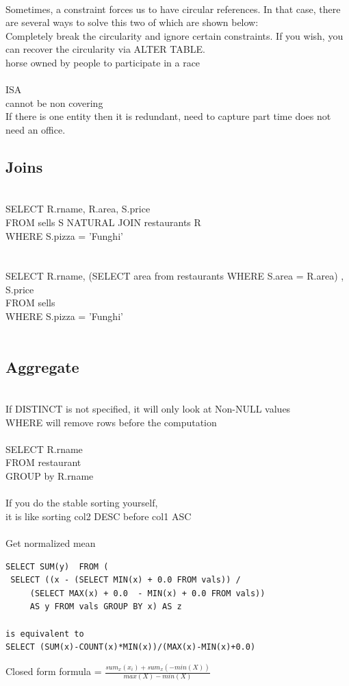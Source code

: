 \documentclass[11pt]{article}
\begin{document}
\\
Sometimes, a constraint forces us to have circular references.  In that case, there are several ways to solve this two of which are shown below:
\\
Completely break the circularity and ignore certain constraints.
If you wish, you can recover the circularity via ALTER TABLE.
\\
horse owned by people to participate in a race
\\\\
ISA\\ 
cannot be non covering\\
If there is one entity then it is redundant, need to capture part time does not need an office.
\\
\subsection*{Joins}\\
SELECT R.rname, R.area, S.price\\
FROM sells S NATURAL JOIN restaurants R\\
WHERE S.pizza = 'Funghi'\\
\\\\
SELECT R.rname, (SELECT area from restaurants WHERE S.area = R.area) , S.price\\
FROM sells \\
WHERE S.pizza = 'Funghi'\\\\
\subsection*{Aggregate}\\
If DISTINCT is not specified, it will only look at Non-NULL values\\
WHERE will remove rows before the computation\\
\\
SELECT R.rname\\
FROM restaurant \\
GROUP by R.rname\\
\\
If you do the stable sorting yourself,\\
it is like sorting col2 DESC before col1 ASC
\\
\\
Get normalized mean
\begin{verbatim}
SELECT SUM(y)  FROM (
 SELECT ((x - (SELECT MIN(x) + 0.0 FROM vals)) /
	 (SELECT MAX(x) + 0.0  - MIN(x) + 0.0 FROM vals))  
	 AS y FROM vals GROUP BY x) AS z
	 
is equivalent to 
SELECT (SUM(x)-COUNT(x)*MIN(x))/(MAX(x)-MIN(x)+0.0)
\end{verbatim}
Closed form formula = $\frac{sum_{x}(x_{i}) + sum_{x} (-min(X))}{max(X) - min(X)}$
\end{document}
